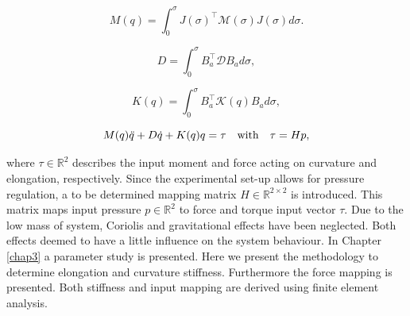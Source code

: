\begin{equation}
    M(q) = \int_0^{\sigma} J(\sigma)^\top \mathcal{M}(\sigma)J(\sigma) d \sigma.
\end{equation}


\begin{equation}
    D = \int_0^\sigma B_a^\top  \mathcal{D} B_a d\sigma,
\end{equation}


\begin{equation}
    K(q) = \int_0^\sigma B_a ^\top \mathcal{K}(q) B_a d\sigma,
\end{equation}


\begin{equation}
    M(q)\Ddot{q} + D\dot{q} + K(q)q = \tau  \hspace{10pt} \text{with} \hspace{10pt} \tau = Hp,
    \label{eq2:simp_model}
\end{equation}

where $\tau \in \mathbb{R}^2$ describes the input moment and force acting on curvature and elongation, respectively. Since the experimental set-up allows for pressure regulation, a to be determined mapping matrix $H \in \mathbb{R}^{2\times2}$ is introduced. This matrix maps input pressure $p \in \mathbb{R}^2$ to force and torque input vector $\tau$. Due to the low mass of system, Coriolis and gravitational effects have been neglected. Both effects deemed to have a little influence on the system behaviour. In Chapter \ref{chap3} a parameter study is presented. Here we present the methodology to determine elongation and curvature stiffness. Furthermore the force mapping is presented. Both stiffness and input mapping are derived using finite element analysis.




